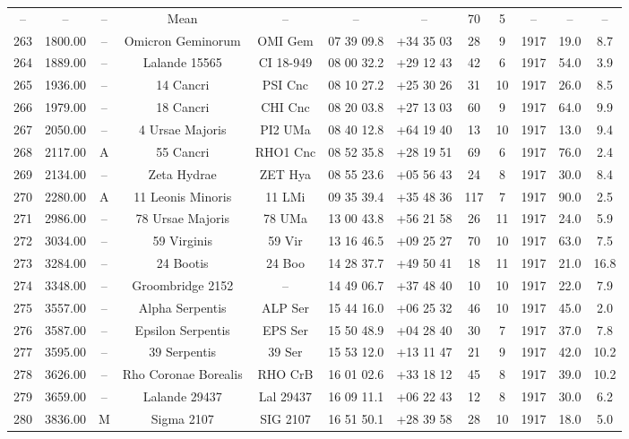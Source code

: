 \begin{table}
\begin{tabular}{cccccccccccc}
-- & -- & -- & Mean & -- & -- & -- & 70 & 5 & -- & -- & -- \\
263 & 1800.00 & -- & Omicron  Geminorum & OMI Gem & 07 39 09.8 & +34 35 03 & 28 & 9 & 1917 & 19.0 & 8.7 \\
264 & 1889.00 & -- & Lalande 15565 & CI 18-949 & 08 00 32.2 & +29 12 43 & 42 & 6 & 1917 & 54.0 & 3.9 \\
265 & 1936.00 & -- & 14 Cancri & PSI Cnc & 08 10 27.2 & +25 30 26 & 31 & 10 & 1917 & 26.0 & 8.5 \\
266 & 1979.00 & -- & 18 Cancri & CHI Cnc & 08 20 03.8 & +27 13 03 & 60 & 9 & 1917 & 64.0 & 9.9 \\
267 & 2050.00 & -- & 4 Ursae Majoris & PI2 UMa & 08 40 12.8 & +64 19 40 & 13 & 10 & 1917 & 13.0 & 9.4 \\
268 & 2117.00 & A & 55 Cancri & RHO1 Cnc & 08 52 35.8 & +28 19 51 & 69 & 6 & 1917 & 76.0 & 2.4 \\
269 & 2134.00 & -- & Zeta Hydrae & ZET Hya & 08 55 23.6 & +05 56 43 & 24 & 8 & 1917 & 30.0 & 8.4 \\
270 & 2280.00 & A & 11 Leonis Minoris & 11 LMi & 09 35 39.4 & +35 48 36 & 117 & 7 & 1917 & 90.0 & 2.5 \\
271 & 2986.00 & -- & 78 Ursae Majoris & 78 UMa & 13 00 43.8 & +56 21 58 & 26 & 11 & 1917 & 24.0 & 5.9 \\
272 & 3034.00 & -- & 59 Virginis & 59 Vir & 13 16 46.5 & +09 25 27 & 70 & 10 & 1917 & 63.0 & 7.5 \\
273 & 3284.00 & -- & 24 Bootis & 24 Boo & 14 28 37.7 & +49 50 41 & 18 & 11 & 1917 & 21.0 & 16.8 \\
274 & 3348.00 & -- & Groombridge 2152 & -- & 14 49 06.7 & +37 48 40 & 10 & 10 & 1917 & 22.0 & 7.9 \\
275 & 3557.00 & -- & Alpha Serpentis & ALP Ser & 15 44 16.0 & +06 25 32 & 46 & 10 & 1917 & 45.0 & 2.0 \\
276 & 3587.00 & -- & Epsilon Serpentis & EPS Ser & 15 50 48.9 & +04 28 40 & 30 & 7 & 1917 & 37.0 & 7.8 \\
277 & 3595.00 & -- & 39 Serpentis & 39 Ser & 15 53 12.0 & +13 11 47 & 21 & 9 & 1917 & 42.0 & 10.2 \\
278 & 3626.00 & -- & Rho Coronae Borealis & RHO CrB & 16 01 02.6 & +33 18 12 & 45 & 8 & 1917 & 39.0 & 10.2 \\
279 & 3659.00 & -- & Lalande 29437 & Lal 29437 & 16 09 11.1 & +06 22 43 & 12 & 8 & 1917 & 30.0 & 6.2 \\
280 & 3836.00 & M & Sigma 2107 & SIG 2107 & 16 51 50.1 & +28 39 58 & 28 & 10 & 1917 & 18.0 & 5.0 \\

\end{tabular}
\end{table}
